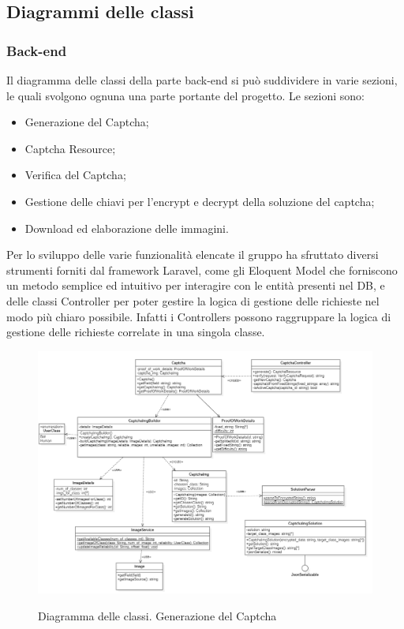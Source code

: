 \subsection{Diagrammi delle classi}

\subsubsection{Back-end}

Il diagramma delle classi della parte back-end si può suddividere in varie sezioni, le quali svolgono ognuna una parte portante del progetto. Le sezioni sono:
\begin{itemize}
    \item Generazione del Captcha;
    \item Captcha Resource;
    \item Verifica del Captcha;
    \item Gestione delle chiavi per l'encrypt e decrypt della soluzione del captcha;
    \item Download ed elaborazione delle immagini.
\end{itemize}

Per lo sviluppo delle varie funzionalità elencate il gruppo ha sfruttato diversi strumenti forniti dal framework Laravel, 
come gli Eloquent Model che forniscono un metodo semplice ed intuitivo per interagire con le entità presenti nel DB, e delle classi 
Controller per poter gestire la logica di gestione delle richieste nel modo più chiaro possibile. Infatti i Controllers possono 
raggruppare la logica di gestione delle richieste correlate in una singola classe.


\begin{figure}[H]
    \centering
    \includegraphics[scale = 0.45]{img/generate.png}\\
    \caption{Diagramma delle classi. Generazione del Captcha}
\end{figure}
\newpage

